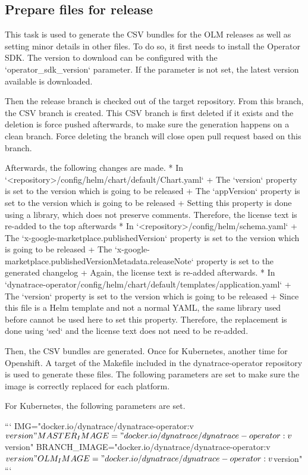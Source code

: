 \subsection{Prepare files for release}\label{subsec:prepare-files-for-release}

This task is used to generate the CSV bundles for the OLM releases as well as setting minor details in other files.
To do so, it first needs to install the Operator SDK.
The version to download can be configured with the `operator_sdk_version` parameter.
If the parameter is not set, the latest version available is downloaded.

Then the release branch is checked out of the target repository.
From this branch, the CSV branch is created.
This CSV branch is first deleted if it exists and the deletion is force pushed afterwards, to make sure the generation happens on a clean branch.
Force deleting the branch will close open pull request based on this branch.

Afterwards, the following changes are made.
* In `<repository>/config/helm/chart/default/Chart.yaml`
+ The `version` property is set to the version which is going to be released
+ The `appVersion` property is set to the version which is going to be released
+ Setting this property is done using a library, which does not preserve comments.
Therefore, the license text is re-added to the top afterwards
* In `<repository>/config/helm/schema.yaml`
+ The `x-google-marketplace.publishedVersion` property is set to the version which is going to be released
+ The `x-google-marketplace.publishedVersionMetadata.releaseNote` property is set to the generated changelog
+ Again, the license text is re-added afterwards.
* In `dynatrace-operator/config/helm/chart/default/templates/application.yaml`
+ The `version` property is set to the version which is going to be released
+ Since this file is a Helm template and not a normal YAML, the same library used before cannot be used here to set this property.
Therefore, the replacement is done using `sed` and the license text does not need to be re-added.

Then, the CSV bundles are generated.
Once for Kubernetes, another time for Openshift.
A target of the Makefile included in the dynatrace-operator repository is used to generate these files.
The following parameters are set to make sure the image is correctly replaced for each platform.

For Kubernetes, the following parameters are set.

```
IMG="docker.io/dynatrace/dynatrace-operator:v${version}"
MASTER_IMAGE="docker.io/dynatrace/dynatrace-operator:v${version}"
BRANCH_IMAGE="docker.io/dynatrace/dynatrace-operator:v${version}"
OLM_IMAGE="docker.io/dynatrace/dynatrace-operator:v${version}"
```

